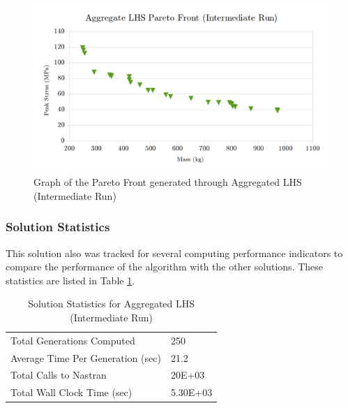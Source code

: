 \begin{figure}[!htbp]
\includegraphics[width=\textwidth]{img/pf_agg_int.png}
\caption{Graph of the Pareto Front generated through Aggregated LHS (Intermediate Run)}
\label{fig:pfront_agg_int}
\end{figure}

\subsubsection{Solution Statistics}
This solution also was tracked for several computing performance indicators to compare the performance of the algorithm with the other solutions. These statistics are listed in Table \ref{tab:stat_agg_int}. 

\begin{table}[!htbp]
  \centering
\caption{Solution Statistics for Aggregated LHS (Intermediate Run)}
  \label{tab:stat_agg_int}
  \begin{tabular}{|l|l|}
    \hline
	  Total Generations Computed & 250\\
    Average Time Per Generation (sec) & 21.2\\
    Total Calls to Nastran & 20E+03\\
    Total Wall Clock Time (sec)	 & 5.30E+03\\
    \hline
  \end{tabular}
\end{table} 

